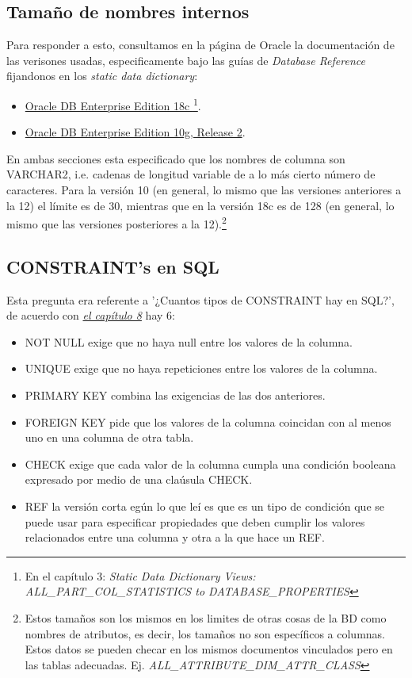 \documentclass[10pt]{article}
\begin{document}
	\subsection*{Tamaño de nombres internos}
	Para  responder a esto, consultamos en la página de Oracle la documentación
	de las verisones usadas, especificamente bajo las guías de \textit{Database Reference}
	fijandonos en los \textit{static data dictionary}:
	    \begin{itemize}
	        \item \href{https://docs.oracle.com/en/database/oracle/oracle-database/18/refrn/database-reference.pdf}
	        {Oracle DB Enterprise Edition 18c \footnote{En el capítulo 3: \textit{Static Data Dictionary Views: 
	        ALL\_PART\_COL\_STATISTICS to DATABASE\_PROPERTIES}}}.
	        \item \href{https://docs.oracle.com/cd/B19306_01/server.102/b14237/statviews_2005.htm#i1583352}
	        {Oracle DB Enterprise Edition 10g, Release 2}.
	    \end{itemize}
	En ambas secciones esta especificado que los nombres de columna son VARCHAR2, i.e. 
	cadenas de longitud variable de a lo más cierto número de caracteres. Para la versión
	10 (en general, lo mismo que las versiones anteriores a la 12) el límite es de 30, 
	mientras que en la versión 18c es de 128 (en general, lo mismo que las versiones
	posteriores a la 12).\footnote{Estos tamaños son los mismos en los limites de otras 
	cosas de la BD como nombres de atributos, es decir, los tamaños no son específicos a 
	columnas. Estos datos se pueden checar en los mismos documentos vinculados pero en 
	las tablas adecuadas. Ej. \textit{ALL\_ATTRIBUTE\_DIM\_ATTR\_CLASS}}
	
	\subsection*{CONSTRAINT's en SQL}
	Esta pregunta era referente a '¿Cuantos tipos de CONSTRAINT hay en SQL?', de acuerdo
	con \href{https://docs.oracle.com/en/database/oracle/oracle-database/18/sqlrf/sql-language-reference.pdf}
	{\textit{el capítulo 8}} hay 6:
	\begin{itemize}
	\small
	    \item NOT NULL exige que no haya null entre los valores de la columna.
        \item UNIQUE exige que no haya repeticiones entre los valores de la columna.
        \item PRIMARY KEY combina las exigencias de las dos anteriores.
        \item FOREIGN KEY pide que los valores de la columna coincidan con al menos uno
        en una columna de otra tabla.
        \item CHECK exige que cada valor de la columna cumpla una condición booleana
        expresado por medio de una claúsula CHECK.
        \item REF la versión corta egún lo que leí es que es un tipo de condición que se
        puede usar para especificar propiedades que deben cumplir los valores relacionados
        entre una columna y otra a la que hace un REF.
    \end{itemize}
	
\end{document}

